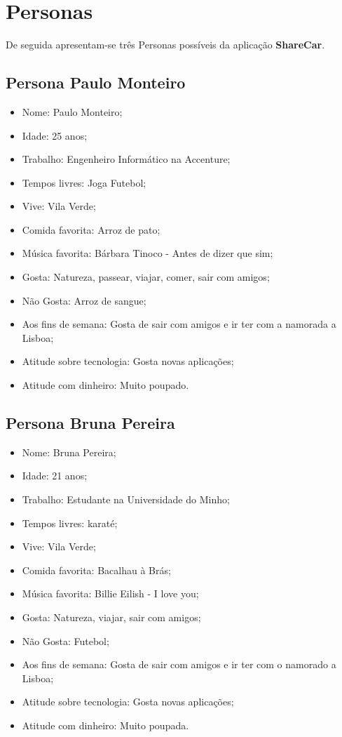 \section{Personas}
De seguida apresentam-se três Personas possíveis da aplicação \textbf{ShareCar}.

\subsection{Persona Paulo Monteiro}

\begin{itemize}
    \item Nome: Paulo Monteiro;
    \item Idade: 25 anos;
    \item Trabalho: Engenheiro Informático na Accenture;
    \item Tempos livres: Joga Futebol;
    \item Vive: Vila Verde;
    \item Comida favorita: Arroz de pato;
    \item Música favorita: Bárbara Tinoco - Antes de dizer que sim;
    \item Gosta: Natureza, passear, viajar, comer, sair com amigos;
    \item Não Gosta: Arroz de sangue;
    \item Aos fins de semana: Gosta de sair com amigos e ir ter com a namorada a Lisboa;
    \item Atitude sobre tecnologia: Gosta novas aplicações;
    \item Atitude com dinheiro: Muito poupado.
\end{itemize}{}

\subsection{Persona Bruna Pereira}

\begin{itemize}
    \item Nome: Bruna Pereira;
    \item Idade: 21 anos;
    \item Trabalho: Estudante na Universidade do Minho;
    \item Tempos livres: karaté;
    \item Vive: Vila Verde;
    \item Comida favorita: Bacalhau à Brás;
    \item Música favorita: Billie Eilish - I love you;
    \item Gosta: Natureza, viajar, sair com amigos;
    \item Não Gosta: Futebol;
    \item Aos fins de semana: Gosta de sair com amigos e ir ter com o namorado a Lisboa;
    \item Atitude sobre tecnologia: Gosta novas aplicações;
    \item Atitude com dinheiro: Muito poupada.
\end{itemize}{}

